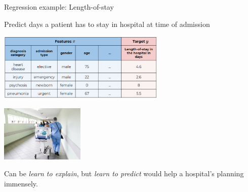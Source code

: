 
\begin{vbframe}{Regression example: Length-of-stay}
  
  Predict days a patient has to stay in hospital at time of admission
       
    
    \begin{center}
    \includegraphics[width=0.6\textwidth]{figure_man/ml-basics-supervised-task-hosp-data.png} 
    
    \lz
    
    \includegraphics[width=0.3\textwidth]{figure_man/ml-basics-supervised-task-hosp-pic.jpg} 
    
    \end{center}
    
    Can be \textit{learn to explain}, but \textit{learn to predict} would help
    a hospital's planning immensely. 
  
  

\end{vbframe}


